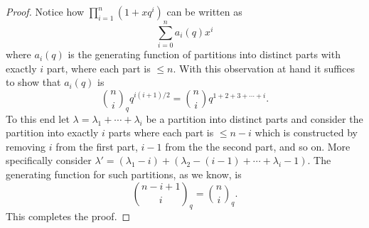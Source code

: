 \begin{proof}
Notice how $\prod_{i=1}^{n}(1+xq^i)$ can be written as \[
\sum_{i=0}^{n}a_i(q)x^i
\]
where $a_i(q)$ is the generating function of partitions into distinct parts with exactly $i$ part, where each part is $\leq n$. With this observation at hand it suffices to show that $a_i(q)$ is 
\[
\binom{n}{i}_q q^{i(i+1)/2}=\binom{n}{i}q^{1+2+3+\cdots+i}.
\]
To this end let $\lambda=\lambda_1+\cdots+\lambda_i$ be a partition into distinct parts and consider the partition into exactly $i$ parts where each part is $\leq n-i$ which is constructed by removing $i$ from the first part, $i-1$ from the the second part, and so on. More specifically consider $\lambda' = (\lambda_1-i)+(\lambda_2-(i-1)+\cdots+\lambda_i-1)$. The generating function for such partitions, as we know, is \[
\binom{n-i+1}{i}_q = \binom{n}{i}_q.
\]
This completes the proof.
\end{proof}
